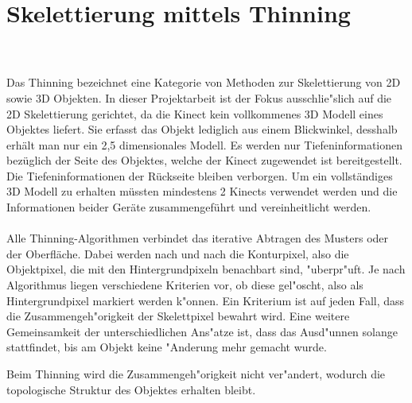 \section{Skelettierung mittels Thinning}
\label{sec:thinning}
\\ \\
Das Thinning bezeichnet eine Kategorie von Methoden zur Skelettierung von 2D sowie 3D Objekten. In dieser Projektarbeit ist der Fokus ausschlie"slich auf die 2D Skelettierung gerichtet, da die Kinect kein vollkommenes 3D Modell eines Objektes liefert. Sie erfasst das Objekt lediglich aus einem Blickwinkel, desshalb erhält man nur ein 2,5 dimensionales Modell. Es werden nur Tiefeninformationen bezüglich der Seite des Objektes, welche der Kinect zugewendet ist bereitgestellt. Die  Tiefeninformationen der Rückseite bleiben verborgen. Um ein vollständiges 3D Modell zu erhalten müssten mindestens 2 Kinects verwendet werden und die Informationen beider Geräte zusammengeführt und vereinheitlicht werden. \\ \\
Alle Thinning-Algorithmen verbindet das iterative Abtragen des Musters oder der Oberfläche. Dabei werden nach und nach die Konturpixel, also die Objektpixel, die mit den Hintergrundpixeln benachbart sind, "uberpr"uft. Je nach Algorithmus liegen verschiedene Kriterien vor, ob diese gel"oscht, also als Hintergrundpixel markiert werden k"onnen. Ein Kriterium ist auf jeden Fall, dass die Zusammengeh"origkeit der Skelettpixel bewahrt wird. Eine weitere Gemeinsamkeit der unterschiedlichen Ans"atze ist, dass das Ausd"unnen solange stattfindet, bis am Objekt keine "Anderung mehr gemacht wurde.

Beim Thinning wird die Zusammengeh"origkeit nicht ver"andert, wodurch die topologische Struktur des Objektes erhalten bleibt. 

